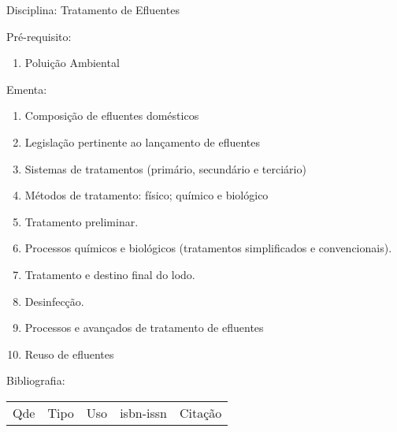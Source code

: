 \documentclass[12pt,a4paper,twoside]{report}
\begin{document}
Disciplina: Tratamento de Efluentes

Pré-requisito:
\begin{enumerate}
\item Poluição Ambiental
\end{enumerate}

Ementa:
\begin{enumerate}
\item Composição de efluentes domésticos
\item Legislação pertinente ao lançamento de efluentes
\item Sistemas de tratamentos (primário, secundário e terciário)
\item Métodos de tratamento: físico; químico e biológico
\item Tratamento preliminar.
\item Processos químicos e biológicos (tratamentos simplificados e convencionais).
\item Tratamento e destino final do lodo.
\item Desinfecção.
\item Processos e avançados de tratamento de efluentes
\item Reuso de efluentes
\end{enumerate}

Bibliografia:
\begin{tabular}{lllll}
Qde & Tipo & Uso & isbn-issn & Citação \\
\end{tabular}
\end{document}
